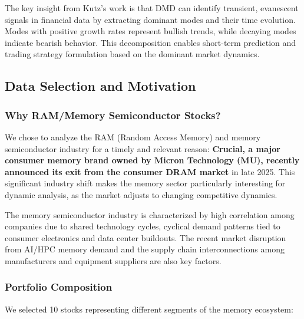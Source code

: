 \documentclass[12pt,a4paper]{article}
\begin{document}
The key insight from Kutz's work is that DMD can identify transient, evanescent signals in financial data by extracting dominant modes and their time evolution. Modes with positive growth rates represent bullish trends, while decaying modes indicate bearish behavior. This decomposition enables short-term prediction and trading strategy formulation based on the dominant market dynamics.

\subsection{Data Selection and Motivation}

\subsubsection{Why RAM/Memory Semiconductor Stocks?}

We chose to analyze the RAM (Random Access Memory) and memory semiconductor industry for a timely and relevant reason: \textbf{Crucial, a major consumer memory brand owned by Micron Technology (MU), recently announced its exit from the consumer DRAM market} in late 2025. This significant industry shift makes the memory sector particularly interesting for dynamic analysis, as the market adjusts to changing competitive dynamics.

The memory semiconductor industry is characterized by high correlation among companies due to shared technology cycles, cyclical demand patterns tied to consumer electronics and data center buildouts. The recent market disruption from AI/HPC memory demand and the supply chain interconnections among manufacturers and equipment suppliers are also key factors.

\subsubsection{Portfolio Composition}

We selected 10 stocks representing different segments of the memory ecosystem:
\end{document}
